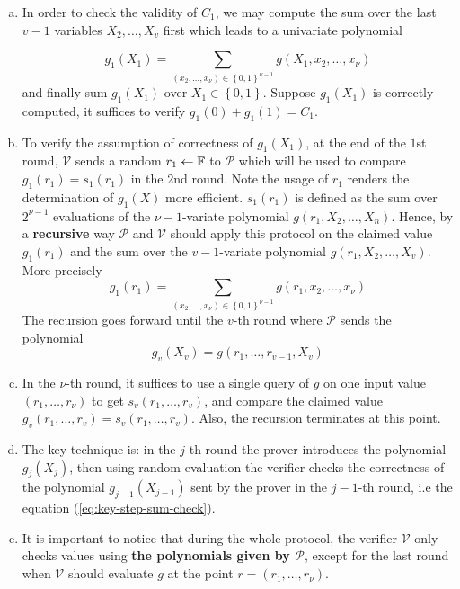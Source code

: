 \documentclass{article}
\begin{document}
\begin{enumerate}[(a)]
\item\label{item:1} In order to check the validity of $C_1$, we may compute the sum over the last $v-1$ variables $X_2, \dots, X_v$ first which leads to a univariate polynomial

\begin{equation*}
g_1(X_1) = \sum_{(x_2, \dots, x_{\nu}) \in \left\{ 0, 1 \right\}^{\nu - 1}}  g(X_1, x_2, \dots, x_{\nu})
\end{equation*}
and finally sum $g_1(X_1)$ over $X_1 \in \left\{0, 1  \right\}$. Suppose $g_1(X_1)$ is correctly computed, it suffices to verify $g_1(0) + g_1(1) = C_1$.
\item\label{item:2} To verify the assumption of correctness of $g_1(X_1)$, at the end of the $1$st round, $\mathcal{V}$ sends a random $r_1 \leftarrow \mathbb{F}$ to $\mathcal{P}$ which will be used to compare $g_1(r_1) = s_1(r_1)$ in the $2$nd round. Note the usage of $r_1$ renders the determination of $g_1(X)$ more efficient. $s_1(r_1)$ is defined as the sum over $2^{\nu - 1}$ evaluations of the $\nu -1$-variate polynomial $g(r_1, X_2, \dots, X_n)$. Hence, by a \textbf{recursive} way $\mathcal{P}$ and $\mathcal{V}$ should apply this protocol on the claimed value $g_1(r_1)$ and the sum over the $v-1$-variate polynomial $g(r_1, X_2, \dots, X_v)$. More precisely
\begin{equation*}
g_1(r_1) = \sum_{(x_2, \dots, x_{\nu}) \in \left\{ 0, 1 \right\}^{\nu - 1}}  g(r_1, x_2, \dots, x_{\nu})
\end{equation*}
The recursion goes forward until the $v$-th round where $\mathcal{P}$ sends the polynomial
\begin{equation*}
g_v(X_v) = g(r_1, \dots, r_{v-1}, X_v)
\end{equation*}
\item\label{item:12} In the $\nu$-th round, it suffices to use a single query of $g$ on one input value $(r_1, \dots, r_{\nu})$ to get $s_v(r_1, \dots, r_v)$, and compare the claimed value $g_v(r_1, \dots, r_v) = s_v(r_1, \dots, r_v)$. Also, the recursion terminates at this point. 
\item\label{item:78} The key technique is: in the $j$-th round the prover introduces the polynomial $g_j(X_j)$, then using random evaluation the verifier checks the correctness of the polynomial $g_{j-1}(X_{j-1})$ sent by the prover in the $j-1$-th round, i.e the equation (\ref{eq:key-step-sum-check}).
\item\label{item:16} It is important to notice that during the whole protocol, the verifier $\mathcal{V}$ only checks values using \textbf{the polynomials given by $\mathcal{P}$}, except for the last round when $\mathcal{V}$ should evaluate $g$ at the point $r = (r_1, \dots, r_{\nu})$. 
\end{enumerate}
\end{document}
